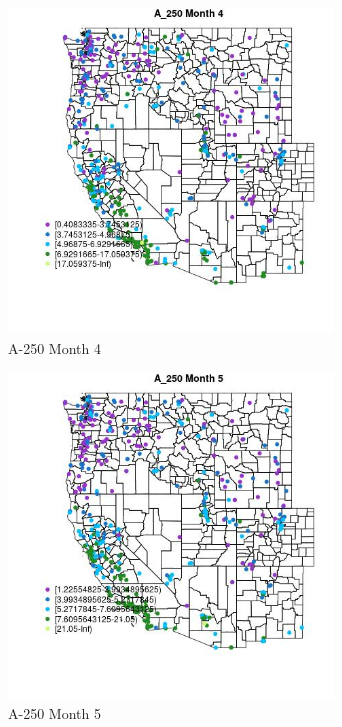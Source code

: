 \begin{figure} 
\centering  
\includegraphics[width=0.77\textwidth]{Code_Outputs/ML_input_report_ML_input_PM25_Step5_part_d_de_duplicated_aves_ML_input_MapObsMo4A_250.jpg} 
\caption{\label{fig:ML_input_report_ML_input_PM25_Step5_part_d_de_duplicated_aves_ML_inputMapObsMo4A_250}A-250 Month 4} 
\end{figure} 
 

\begin{figure} 
\centering  
\includegraphics[width=0.77\textwidth]{Code_Outputs/ML_input_report_ML_input_PM25_Step5_part_d_de_duplicated_aves_ML_input_MapObsMo5A_250.jpg} 
\caption{\label{fig:ML_input_report_ML_input_PM25_Step5_part_d_de_duplicated_aves_ML_inputMapObsMo5A_250}A-250 Month 5} 
\end{figure} 
 

